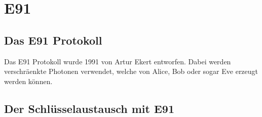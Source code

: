 \section{E91}
  \subsection{Das E91 Protokoll}
  Das E91 Protokoll wurde 1991 von Artur Ekert entworfen.
  Dabei werden verschr\"aenkte Photonen verwendet, welche von Alice, Bob oder sogar Eve erzeugt werden k\"onnen.

  \subsection{Der Schl\"usselaustausch mit E91}
